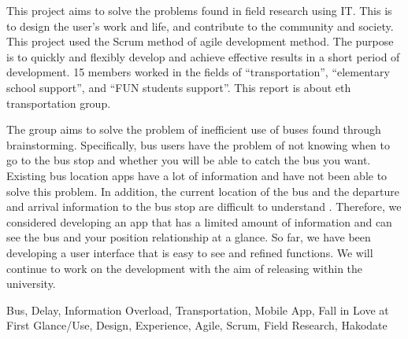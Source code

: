\documentclass[openany,11pt,papersize,dvipdfm,draft]{jsbook}
\begin{document}
\begin{eabstract}
    This project aims to solve the problems found in field research using IT.
    This is to design the user's work and life, and contribute to the community and society.
    This project used the Scrum method of agile development method.
    The purpose is to quickly and flexibly develop and achieve effective results in a short period of development.
    15 members worked in the fields of ``transportation'', ``elementary school support'', and ``FUN students support''.
    This report is about eth transportation group.

    The group aims to solve the problem of inefficient use of buses found through brainstorming.
    Specifically, bus users have the problem of not knowing when to go to the bus stop and whether you will be able to catch the bus you want.
    Existing bus location apps have a lot of information and have not been able to solve this problem.
    In addition, the current location of the bus and the departure and arrival information to the bus stop are difficult to understand .
    Therefore, we considered developing an app that has a limited amount of information and can see the bus and your position relationship at a glance.
    So far, we have been developing a user interface that is easy to see and refined functions.
    We will continue to work on the development with the aim of releasing within the university.

\begin{ekeyword}
Bus, Delay, Information Overload, Transportation, Mobile App, Fall in Love at First Glance/Use, Design, Experience, Agile, Scrum, Field Research, Hakodate
\end{ekeyword}
\end{eabstract}

\tableofcontents

\mainmatter








\begin{appendix}


\end{appendix}
\end{document}
